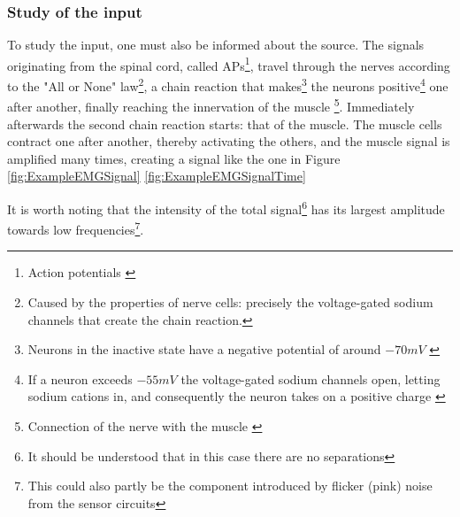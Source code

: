 \documentclass[a4paper, 10pt, final]{article} %
\newcommand{\parenciteit}[2]{\textit{\parencite[#1]{#2}}} %
\begin{document}
    \subsubsection{Study of the input}\label{sec:SensorboardDesignInput}
    To study the input, one must also be informed about the source.
    The signals originating from the spinal cord, called APs\footnote{Action potentials \parenciteit{}{MerlettiMuceli}}, travel through the nerves according to the "All or None" law\footnote{Caused by the properties of nerve cells: precisely the voltage-gated sodium channels \parenciteit{}{SodiumChannel:Wiki} that create the chain reaction.}, a chain reaction that makes\footnote{Neurons in the inactive state have a negative potential of around $-70mV$ \parenciteit{}{AP:Wiki}} the neurons positive\footnote{If a neuron exceeds $-55mV$ the voltage-gated sodium channels open, letting sodium cations in, and consequently the neuron takes on a positive charge \parenciteit{}{AP:Wiki}} one after another, finally reaching the innervation of the muscle \footnote{Connection of the nerve with the muscle \parenciteit{"NMJ" and "innervation zone" p3}{MerlettiMuceli}}.
    Immediately afterwards the second chain reaction starts: that of the muscle.
    The muscle cells contract one after another, thereby activating the others, and the muscle signal  is amplified many times, creating a signal like the one in Figure \ref{fig:ExampleEMGSignal} \ref{fig:ExampleEMGSignalTime}

    It is worth noting that the intensity of the total signal\footnote{It should be understood that in this case there are no separations } has its largest amplitude towards low frequencies\footnote{This could also partly be the component introduced by flicker (pink) noise from the sensor circuits}.
\end{document}
